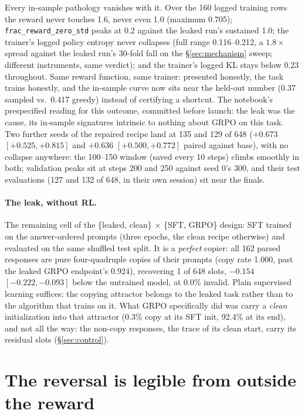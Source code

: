 \documentclass{article}
\begin{document}
Every in-sample pathology vanishes with it. Over the 160 logged training
rows the reward never touches 1.6, never even 1.0 (maximum 0.705); \texttt{frac\_reward\_zero\_std} peaks at 0.2 against the leaked run's sustained 1.0; the trainer's logged policy entropy never collapses (full range 0.116--0.212, a $1.8\times$ spread against the leaked run's 30-fold fall on the \S\ref{sec:mechanism} sweep; different instruments, same verdict); and the trainer's logged KL stays below 0.23 throughout. Same reward function, same trainer: presented honestly, the task trains honestly, and the in-sample curve now sits near the held-out number (0.37 sampled vs.\ 0.417 greedy) instead of certifying a shortcut. The notebook's prespecified reading for this outcome, committed before launch: the leak was the cause, its in-sample signatures intrinsic to nothing about GRPO on this task. Two further seeds of the repaired recipe land at 135 and 129 of 648 ($+0.673$ $[+0.525, +0.815]$ and $+0.636$ $[+0.500, +0.772]$ paired against base), with no collapse anywhere: the 100--150 window (saved every 10 steps) climbs smoothly in both; validation peaks sit at steps 200 and 250 against seed 0's 300, and their test evaluations (127 and 132 of 648, in their own session) sit near the finals.

\paragraph{The leak, without RL.} The remaining cell of the \{leaked, clean\} $\times$ \{SFT, GRPO\} design: SFT trained on the answer-ordered prompts (three epochs, the clean recipe otherwise) and evaluated on the same shuffled test split. It is a \emph{perfect} copier: all 162 parsed responses are pure four-quadruple copies of their prompts (copy rate 1.000, past the leaked GRPO endpoint's 0.924), recovering 1 of 648 slots, $-0.154$ $[-0.222, -0.093]$ below the untrained model, at 0.0\% invalid. Plain supervised learning suffices: the copying attractor belongs to the leaked task rather than to the algorithm that trains on it. What GRPO specifically did was carry a \emph{clean} initialization into that attractor (0.3\% copy at its SFT init, 92.4\% at its end), and not all the way: the non-copy responses, the trace of its clean start, carry its residual slots (\S\ref{sec:control}).

\section{The reversal is legible from outside the reward}
\label{sec:judge}
\end{document}

